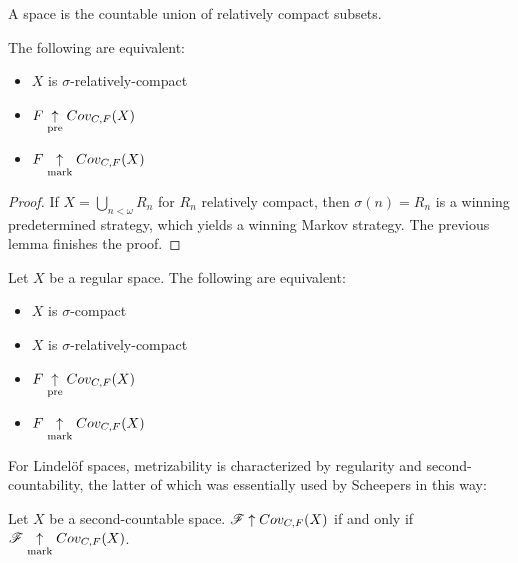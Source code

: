 \begin{defn}
  A  space is the countable union of
  relatively compact subsets.
\end{defn}

\begin{cor}
  The following are equivalent:
  \begin{itemize}
    \item $X$ is $\sigma$-relatively-compact
    \item $F \underset{\text{pre}}{\uparrow} Cov_{C,F}(X)$
    \item $F \underset{\text{mark}}{\uparrow} Cov_{C,F}(X)$
  \end{itemize}
\end{cor}

\begin{proof}
  If $X=\bigcup_{n<\omega} R_n$ for $R_n$ relatively compact, then
  $\sigma(n)=R_n$ is a winning predetermined strategy, which yields a
  winning Markov strategy. The previous lemma finishes the proof.
\end{proof}

\begin{cor}
  Let $X$ be a regular space. The following are equivalent:
  \begin{itemize}
    \item $X$ is $\sigma$-compact
    \item $X$ is $\sigma$-relatively-compact
    \item $F \underset{\text{pre}}{\uparrow} Cov_{C,F}(X)$
    \item $F \underset{\text{mark}}{\uparrow} Cov_{C,F}(X)$
  \end{itemize}
\end{cor}

For Lindel\"of spaces, metrizability is characterized by regularity and
second-countability, the latter of which was essentially used by Scheepers in
this way:

\begin{lem}
  Let $X$ be a second-countable space. $\mathscr{F}\uparrow Cov_{C,F}(X)$ if and only if
  $\mathscr{F}\underset{\text{mark}}{\uparrow}Cov_{C,F}(X)$.
\end{lem}

